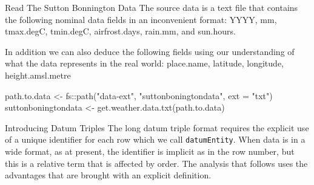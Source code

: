 \documentclass[
  ignorenonframetext,
]{beamer}
\newenvironment{Shaded}{\begin{snugshade}}{\end{snugshade}}
\newcommand{\AttributeTok}[1]{\textcolor[rgb]{0.77,0.63,0.00}{#1}}
\newcommand{\FunctionTok}[1]{\textcolor[rgb]{0.00,0.00,0.00}{#1}}
\newcommand{\NormalTok}[1]{#1}
\newcommand{\OtherTok}[1]{\textcolor[rgb]{0.56,0.35,0.01}{#1}}
\newcommand{\SpecialCharTok}[1]{\textcolor[rgb]{0.00,0.00,0.00}{#1}}
\newcommand{\StringTok}[1]{\textcolor[rgb]{0.31,0.60,0.02}{#1}}
\begin{document}
\begin{frame}[fragile]{Read The Sutton Bonnington Data}
\protect\hypertarget{read-the-sutton-bonnington-data}{}
The source data is a text file that contains the following nominal data
fields in an inconvenient format: YYYY, mm, tmax.degC, tmin.degC,
airfrost.days, rain.mm, and sun.hours.

In addition we can also deduce the following fields using our
understanding of what the data represents in the real world: place.name,
latitude, longitude, height.amsl.metre

\begin{Shaded}
\begin{Highlighting}[]
\NormalTok{path.to.data }\OtherTok{\textless{}{-}}\NormalTok{ fs}\SpecialCharTok{::}\FunctionTok{path}\NormalTok{(}\StringTok{"data{-}ext"}\NormalTok{, }\StringTok{"suttonboningtondata"}\NormalTok{, }\AttributeTok{ext =} \StringTok{"txt"}\NormalTok{)}
\NormalTok{suttonboningtondata }\OtherTok{\textless{}{-}} \FunctionTok{get.weather.data.txt}\NormalTok{(path.to.data)}
\end{Highlighting}
\end{Shaded}
\end{frame}

\begin{frame}[fragile]{Introducing Datum Triples}
\protect\hypertarget{introducing-datum-triples}{}
The long datum triple format requires the explicit use of a unique
identifier for each row which we call \texttt{datumEntity}. When data is
in a wide format, as at present, the identifier is implicit as in the
row number, but this is a relative term that is affected by order. The
analysis that follows uses the advantages that are brought with an
explicit definition.
\end{frame}
\end{document}
